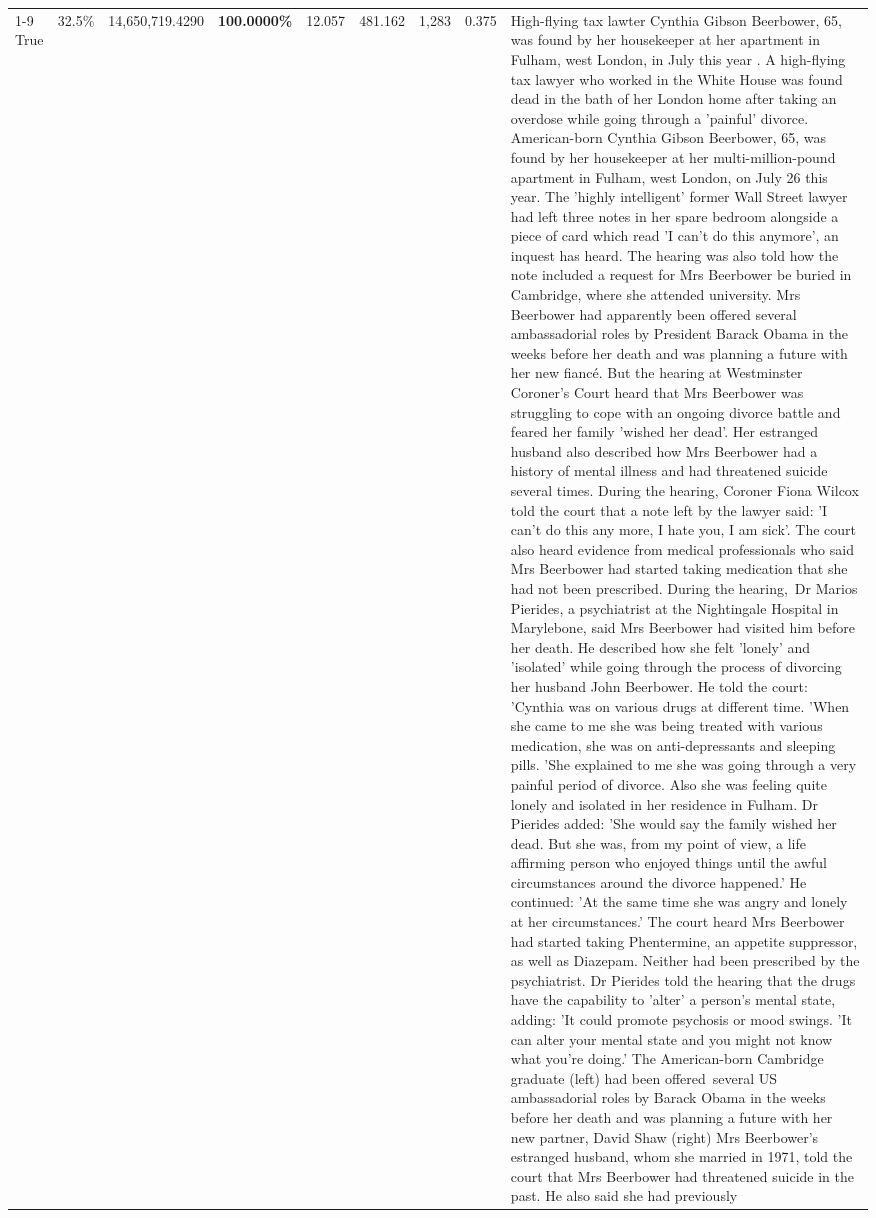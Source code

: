\begin{table}[H]
\begin{tabular}{lllrlllll}
\cline{1-9}
True & 32.5\% & 14,650,719.4290 & \bfseries \color{red} 100.0000\% & 12.057 & 481.162 & 1,283 & 0.375 & High-flying tax lawter Cynthia Gibson Beerbower, 65, was found by her housekeeper at her apartment in Fulham, west London, in July this year . A high-flying tax lawyer who worked in the White House was found dead in the bath of her London home after taking an overdose while going through a 'painful' divorce. American-born Cynthia Gibson Beerbower, 65, was found by her housekeeper at her multi-million-pound apartment in Fulham, west London, on July 26 this year. The 'highly intelligent' former Wall Street lawyer had left three notes in her spare bedroom alongside a piece of card which read 'I can't do this anymore', an inquest has heard. The hearing was also told how the note included a request for Mrs Beerbower be buried in Cambridge, where she attended university. Mrs Beerbower had apparently been offered several ambassadorial roles by President Barack Obama in the weeks before her death and was planning a future with her new fiancé. But the hearing at Westminster Coroner's Court heard that Mrs Beerbower was struggling to cope with an ongoing divorce battle and feared her family 'wished her dead'. Her estranged husband also described how Mrs Beerbower had a history of mental illness and had threatened suicide several times. During the hearing, Coroner Fiona Wilcox told the court that a note left by the lawyer said: 'I can't do this any more, I hate you, I am sick'. The court also heard evidence from medical professionals who said Mrs Beerbower had started taking medication that she had not been prescribed. During the hearing, Dr Marios Pierides, a psychiatrist at the Nightingale Hospital in Marylebone, said Mrs Beerbower had visited him before her death. He described how she felt 'lonely' and 'isolated' while going through the process of divorcing her husband John Beerbower. He told the court: 'Cynthia was on various drugs at different time. 'When she came to me she was being treated with various medication, she was on anti-depressants and sleeping pills. 'She explained to me she was going through a very painful period of divorce. Also she was feeling quite lonely and isolated in her residence in Fulham. Dr Pierides added: 'She would say the family wished her dead. But she was, from my point of view, a life affirming person who enjoyed things until the awful circumstances around the divorce happened.' He continued: 'At the same time she was angry and lonely at her circumstances.' The court heard Mrs Beerbower had started taking Phentermine, an appetite suppressor, as well as Diazepam. Neither had been prescribed by the psychiatrist. Dr Pierides told the hearing that the drugs have the capability to 'alter' a person's mental state, adding: 'It could promote psychosis or mood swings. 'It can alter your mental state and you might not know what you're doing.' The American-born Cambridge graduate (left) had been offered several US ambassadorial roles by Barack Obama in the weeks before her death and was planning a future with her new partner, David Shaw (right) Mrs Beerbower's estranged husband, whom she married in 1971, told the court that Mrs Beerbower had threatened suicide in the past. He also said she had previously 
\end{tabular}
\end{table}
